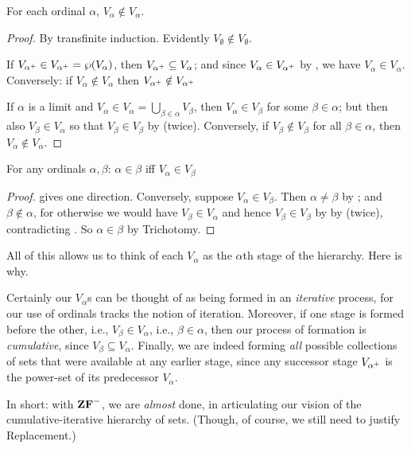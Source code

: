 \documentclass[../../../include/open-logic-section]{subfiles}
\begin{document}
\begin{lem}
For each ordinal $\alpha$, $V_\alpha \notin V_\alpha$.
\end{lem}

\begin{proof}
By transfinite induction. Evidently $V_\emptyset \notin V_\emptyset$. 

If $V_{\alpha^{+}} \in V_{\alpha^{+}} = \wp(V_\alpha)$,
then $V_{\alpha^{+}} \subseteq V_\alpha$; and since $V_\alpha
\in V_{\alpha^{+}}$ by , we have
$V_\alpha \in V_\alpha$. Conversely: if $V_\alpha \notin V_\alpha$
then $V_{\alpha^{+}} \notin V_{\alpha^{+}}$

If $\alpha$ is a limit and $V_\alpha \in V_\alpha = \bigcup_{\beta \in
\alpha}V_\beta$, then $V_\alpha \in V_\beta$ for some $\beta \in
\alpha$; but then also $V_\beta \in V_\alpha$ so that $V_\beta \in
V_\beta$ by  (twice). Conversely, if $V_\beta
\notin V_\beta$ for all $\beta \in \alpha$, then $V_\alpha \notin
V_\alpha$.
\end{proof}

\begin{cor}
For any ordinals $\alpha, \beta$: $\alpha \in \beta$ iff $V_\alpha \in V_\beta$
\end{cor}

\begin{proof}
 gives one direction. Conversely, suppose $V_\alpha \in V_\beta$. Then $\alpha \neq \beta$ by ; and $\beta \notin \alpha$, for otherwise we would have $V_\beta \in V_\alpha$ and hence $V_\beta \in V_\beta$ by by  (twice), contradicting . So $\alpha \in \beta$ by Trichotomy.
\end{proof}

All of this allows us to think of each $V_\alpha$ as the $\alpha$th
stage of the hierarchy. Here is why.

Certainly our $V_\alpha$s can be thought of as being formed in an
\emph{iterative} process, for our use of ordinals tracks the notion of
iteration. Moreover, if one stage is formed before the other, i.e.,
$V_\beta \in V_\alpha$, i.e., $\beta \in \alpha$, then our process of
formation is \emph{cumulative}, since $V_\beta \subseteq V_\alpha$.
Finally, we are indeed forming \emph{all} possible collections of sets
that were available at any earlier stage, since any successor stage
$V_{\alpha^{+}}$ is the power-set of its predecessor $V_\alpha$.

In short: with $\mathbf{ZF}^{-}$, we are \emph{almost} done, in articulating
our vision of the cumulative-iterative hierarchy of sets. (Though, of
course, we still need to justify Replacement.)
\end{document}
